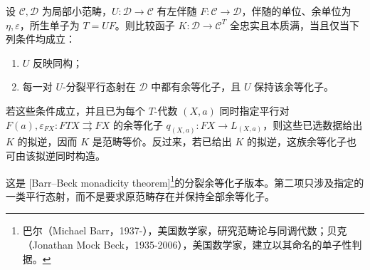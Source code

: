 \begin{theorem}\label{b4:thm:A-beck-monadicity}
	设 \(\mathcal C,\mathcal D\) 为局部小范畴，\(U:\mathcal D\to\mathcal C\) 有左伴随 \(F:\mathcal C\to\mathcal D\)，伴随的单位、余单位为 \(\eta,\varepsilon\)，所生单子为 \(T=UF\)。则比较函子 \(K:\mathcal D\to\mathcal C^T\) 全忠实且本质满，当且仅当下列条件均成立：
	\begin{enumerate}
		\item \(U\) 反映同构；
		\item 每一对 \(U\)-分裂平行态射在 \(\mathcal D\) 中都有余等化子，且 \(U\) 保持该余等化子。
	\end{enumerate}
	若这些条件成立，并且已为每个 \(T\)-代数 \((X,a)\) 同时指定平行对 \(F(a),\varepsilon_{FX}:FTX\rightrightarrows FX\) 的余等化子 \(q_{(X,a)}:FX\to L_{(X,a)}\)，则这些已选数据给出 \(K\) 的拟逆，因而 \(K\) 是范畴等价。反过来，若已给出 \(K\) 的拟逆，这族余等化子也可由该拟逆同时构造。
\end{theorem}
这是 [Barr--Beck monadicity theorem]\footnote{巴尔（Michael Barr，1937-），美国数学家，研究范畴论与同调代数；贝克（Jonathan Mock Beck，1935-2006），美国数学家，建立以其命名的单子性判据。}的分裂余等化子版本。第二项只涉及指定的一类平行态射，而不是要求原范畴存在并保持全部余等化子。
